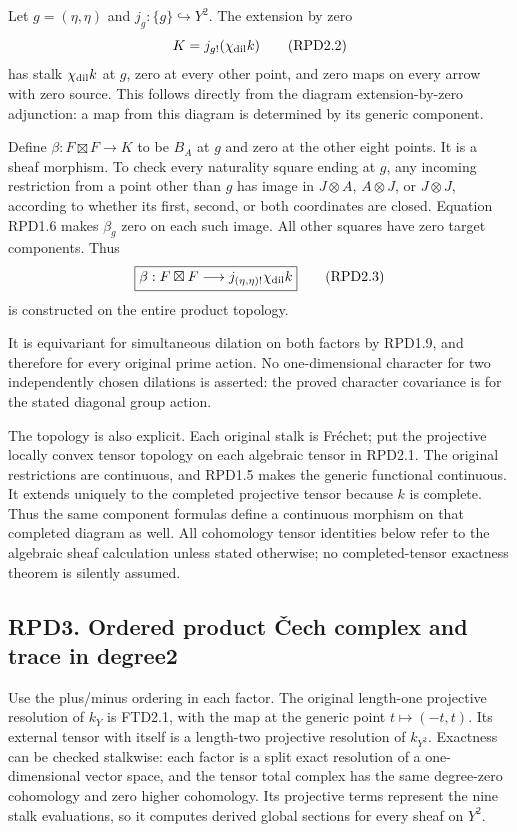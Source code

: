 Let \(g=(\eta,\eta)\) and \(j_g:\{g\}\hookrightarrow Y^2\). The
extension by zero \[
K=j_{g!}(\chi_{\rm dil}k)
\tag{RPD2.2}
\] has stalk \(\chi_{\rm dil}k\) at \(g\), zero at every other point,
and zero maps on every arrow with zero source. This follows directly
from the diagram extension-by-zero adjunction: a map from this diagram
is determined by its generic component.

Define \(\beta:F\boxtimes F\to K\) to be \(B_A\) at \(g\) and zero at
the other eight points. It is a sheaf morphism. To check every
naturality square ending at \(g\), any incoming restriction from a point
other than \(g\) has image in \(J\otimes A\), \(A\otimes J\), or
\(J\otimes J\), according to whether its first, second, or both
coordinates are closed. Equation RPD1.6 makes \(\beta_g\) zero on each
such image. All other squares have zero target components. Thus \[
\boxed{\beta:F\boxtimes F\longrightarrow j_{(\eta,\eta)!}\chi_{\rm dil}k}
\tag{RPD2.3}
\] is constructed on the entire product topology.

It is equivariant for simultaneous dilation on both factors by RPD1.9,
and therefore for every original prime action. No one-dimensional
character for two independently chosen dilations is asserted: the proved
character covariance is for the stated diagonal group action.

The topology is also explicit. Each original stalk is Fréchet; put the
projective locally convex tensor topology on each algebraic tensor in
RPD2.1. The original restrictions are continuous, and RPD1.5 makes the
generic functional continuous. It extends uniquely to the completed
projective tensor because \(k\) is complete. Thus the same component
formulas define a continuous morphism on that completed diagram as well.
All cohomology tensor identities below refer to the algebraic sheaf
calculation unless stated otherwise; no completed-tensor exactness
theorem is silently assumed.

\subsection{RPD3. Ordered product Čech complex and trace in
degree2}\label{rpd3.-ordered-product-ux10dech-complex-and-trace-in-degree2}

Use the plus/minus ordering in each factor. The original length-one
projective resolution of \(k_Y\) is FTD2.1, with the map at the generic
point \(t\mapsto(-t,t)\). Its external tensor with itself is a
length-two projective resolution of \(k_{Y^2}\). Exactness can be
checked stalkwise: each factor is a split exact resolution of a
one-dimensional vector space, and the tensor total complex has the same
degree-zero cohomology and zero higher cohomology. Its projective terms
represent the nine stalk evaluations, so it computes derived global
sections for every sheaf on \(Y^2\).

